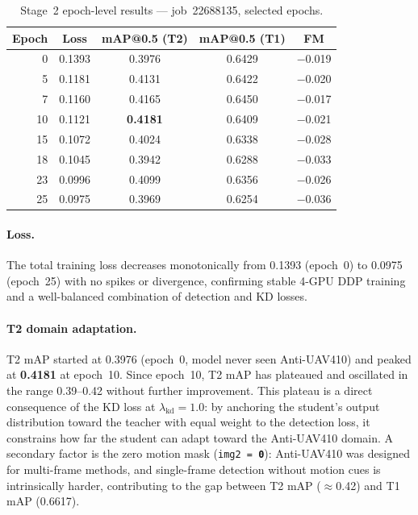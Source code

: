 \begin{table}[h]
\centering
\caption{Stage~2 epoch-level results — job~22688135, selected epochs.}
\label{tab:stage2_epochs}
\small
\begin{tabular}{rcccc}
\hline
\textbf{Epoch} & \textbf{Loss} & \textbf{mAP@0.5 (T2)} & \textbf{mAP@0.5 (T1)} & \textbf{FM} \\
\hline
 0 & 0.1393 & 0.3976 & 0.6429 & $-$0.019 \\
 5 & 0.1181 & 0.4131 & 0.6422 & $-$0.020 \\
 7 & 0.1160 & 0.4165 & 0.6450 & $-$0.017 \\
10 & 0.1121 & \textbf{0.4181} & 0.6409 & $-$0.021 \\
15 & 0.1072 & 0.4024 & 0.6338 & $-$0.028 \\
18 & 0.1045 & 0.3942 & 0.6288 & $-$0.033 \\
23 & 0.0996 & 0.4099 & 0.6356 & $-$0.026 \\
25 & 0.0975 & 0.3969 & 0.6254 & $-$0.036 \\
\hline
\end{tabular}
\end{table}

\paragraph{Loss.}
The total training loss decreases monotonically from 0.1393 (epoch~0)
to 0.0975 (epoch~25) with no spikes or divergence, confirming stable
4-GPU DDP training and a well-balanced combination of detection and
KD losses.

\paragraph{T2 domain adaptation.}
T2 mAP started at 0.3976 (epoch~0, model never seen Anti-UAV410)
and peaked at \textbf{0.4181} at epoch~10. Since epoch~10, T2 mAP
has plateaued and oscillated in the range 0.39--0.42 without further
improvement. This plateau is a direct consequence of the KD loss
at $\lambda_{\text{kd}}=1.0$: by anchoring the student's output
distribution toward the teacher with equal weight to the detection
loss, it constrains how far the student can adapt toward the
Anti-UAV410 domain. A secondary factor is the zero motion mask
(\texttt{img2\,=\,\textbf{0}}): Anti-UAV410 was designed for
multi-frame methods, and single-frame detection without motion cues
is intrinsically harder, contributing to the gap between T2
mAP ($\approx$0.42) and T1 mAP (0.6617).

